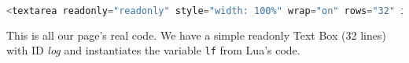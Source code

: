 \begin{lstlisting}[language=javascript,caption={HTML - Log Code (IV)}]
<textarea readonly="readonly" style="width: 100%" wrap="on" rows="32" id="log"><%=lf:pcdata()%></textarea>
\end{lstlisting}

This is all our page's real code. We have a simple readonly Text Box (32 lines) with ID \textit{log} and instantiates the variable \texttt{lf} from Lua's code.